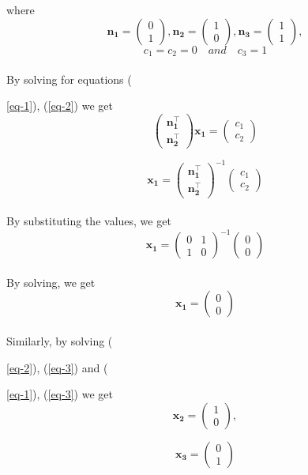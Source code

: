 \documentclass[journal,12pt,twocolumn]{IEEEtran}
\newcommand{\myvec}[1]{\ensuremath{\begin{pmatrix}#1\end{pmatrix}}}
\let\vec\mathbf
\begin{document}
where \begin{equation}	
	\vec{n_1} = \myvec{0 \\ 1}
	, \vec{n_2} = \myvec{1 \\ 0}, \vec{n_3} = \myvec{1 \\ 1},
\end{equation}
\begin{equation}
c_1=c_2=0 \quad and \quad c_3=1
\end{equation}
\\
By solving for equations ({\ref{eq-1}), (\ref{eq-2}) we get
\begin{equation}
\begin{pmatrix}
\vec{n_1^{\top}} \\
\vec{n_2^{\top}} 
\end{pmatrix} \vec{x_1} = \myvec{ c_1\\c_2}  \label{eq-6}
\end{equation}

\begin{equation}
\vec{x_1} = \begin{pmatrix}
\vec{n_1^{\top}} \\
\vec{n_2^{\top}} 
\end{pmatrix}^{-1}  \myvec{ c_1\\c_2}  \label{eq-7}
\end{equation}
\\
By substituting the values, we get
\begin{equation}
\vec{x_1} = \begin{pmatrix}
0 & 1 \\
1 & 0 
\end{pmatrix}^{-1}  \myvec{ 0\\0}  \label{eq-8}
\end{equation}
\\
By solving, we get
\begin{equation}
\vec{x_1} = \myvec{ 0\\0}  \label{eq-9}
\end{equation}
\\
Similarly, by solving ({\ref{eq-2}), (\ref{eq-3}) and ({\ref{eq-1}), (\ref{eq-3}) we get 
\begin{equation}
\vec{x_2} = \myvec{ 1\\0}  \label{eq-10},
\end{equation}

\begin{equation}
\vec{x_3} = \myvec{ 0\\1}  \label{eq-11}
\end{equation}
\\

}}}
\end{document}
